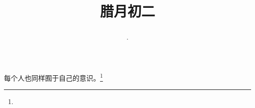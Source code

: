 \title{\date[d=12,m=1,y=2024][year:cn-y,年,month:cn,day:cn,日,·,weekday]·腊月初二 }
每个人也同样囿于自己的意识。\footnote{ }

